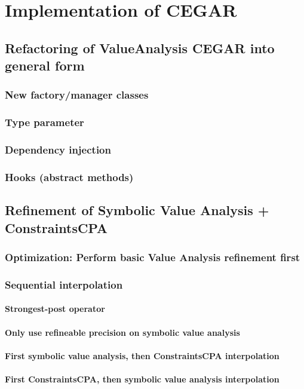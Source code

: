 \documentclass[a4paper,11pt]{article}
\begin{document}
\section{Implementation of CEGAR}
\subsection{Refactoring of ValueAnalysis CEGAR into general form}
\subsubsection{New factory/manager classes}
\subsubsection{Type parameter}
\subsubsection{Dependency injection}
\subsubsection{Hooks (abstract methods)}

\subsection{Refinement of Symbolic Value Analysis + ConstraintsCPA}
\subsubsection{Optimization: Perform basic Value Analysis refinement first}
\subsubsection{Sequential interpolation}
\paragraph{Strongest-post operator}
\paragraph{Only use refineable precision on symbolic value analysis}
\paragraph{First symbolic value analysis, then ConstraintsCPA interpolation}
\paragraph{First ConstraintsCPA, then symbolic value analysis interpolation}
\end{document}
